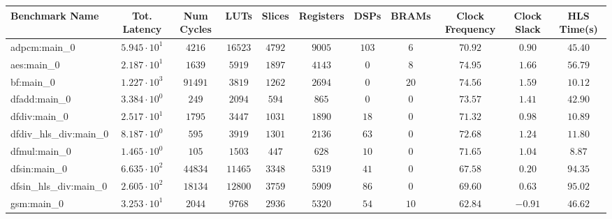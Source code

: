 \begin{tabular}{|l|c|c|c|c|c|c|c|c|c|c|}
\hline
Benchmark Name          & Tot. Latency           & Num Cycles & LUTs      & Slices    & Registers & DSPs    & BRAMs   & Clock Frequency & Clock Slack & HLS Time(s) \\
\hline
adpcm:main\_0           & $ 5.945 \cdot 10^{1} $ & $ 4216   $ & $ 16523 $ & $ 4792  $ & $ 9005  $ & $ 103 $ & $ 6   $ & $ 70.92       $ & $ 0.90    $ & $ 45.40   $ \\
aes:main\_0             & $ 2.187 \cdot 10^{1} $ & $ 1639   $ & $ 5919  $ & $ 1897  $ & $ 4143  $ & $ 0   $ & $ 8   $ & $ 74.95       $ & $ 1.66    $ & $ 56.79   $ \\
bf:main\_0              & $ 1.227 \cdot 10^{3} $ & $ 91491  $ & $ 3819  $ & $ 1262  $ & $ 2694  $ & $ 0   $ & $ 20  $ & $ 74.56       $ & $ 1.59    $ & $ 10.12   $ \\
dfadd:main\_0           & $ 3.384 \cdot 10^{0} $ & $ 249    $ & $ 2094  $ & $ 594   $ & $ 865   $ & $ 0   $ & $ 0   $ & $ 73.57       $ & $ 1.41    $ & $ 42.90   $ \\
dfdiv:main\_0           & $ 2.517 \cdot 10^{1} $ & $ 1795   $ & $ 3447  $ & $ 1031  $ & $ 1890  $ & $ 18  $ & $ 0   $ & $ 71.32       $ & $ 0.98    $ & $ 10.89   $ \\
dfdiv\_hls\_div:main\_0 & $ 8.187 \cdot 10^{0} $ & $ 595    $ & $ 3919  $ & $ 1301  $ & $ 2136  $ & $ 63  $ & $ 0   $ & $ 72.68       $ & $ 1.24    $ & $ 11.80   $ \\
dfmul:main\_0           & $ 1.465 \cdot 10^{0} $ & $ 105    $ & $ 1503  $ & $ 447   $ & $ 628   $ & $ 10  $ & $ 0   $ & $ 71.65       $ & $ 1.04    $ & $ 8.87    $ \\
dfsin:main\_0           & $ 6.635 \cdot 10^{2} $ & $ 44834  $ & $ 11465 $ & $ 3348  $ & $ 5319  $ & $ 41  $ & $ 0   $ & $ 67.58       $ & $ 0.20    $ & $ 94.35   $ \\
dfsin\_hls\_div:main\_0 & $ 2.605 \cdot 10^{2} $ & $ 18134  $ & $ 12800 $ & $ 3759  $ & $ 5909  $ & $ 86  $ & $ 0   $ & $ 69.60       $ & $ 0.63    $ & $ 95.02   $ \\
gsm:main\_0             & $ 3.253 \cdot 10^{1} $ & $ 2044   $ & $ 9768  $ & $ 2936  $ & $ 5320  $ & $ 54  $ & $ 10  $ & $ 62.84       $ & $ -0.91   $ & $ 46.62   $ \\

\end{tabular}
